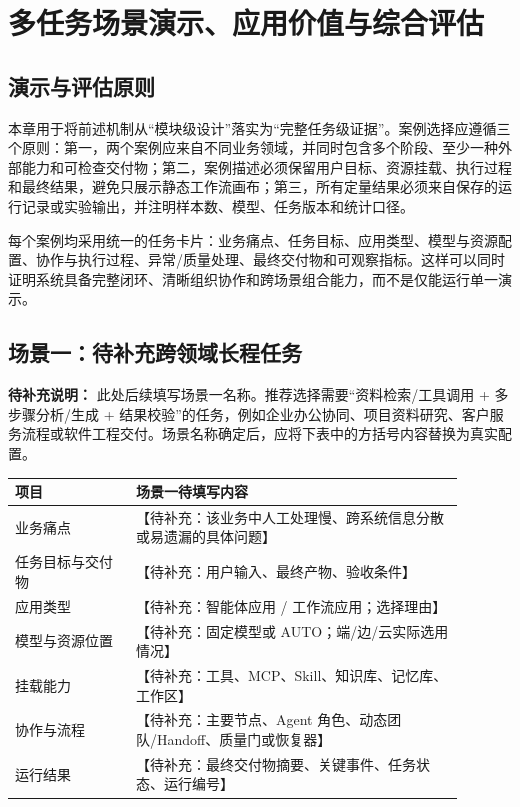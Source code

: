 \documentclass[UTF8,a4paper,12pt]{ctexart}
\begin{document}
\section{多任务场景演示、应用价值与综合评估}

\subsection{演示与评估原则}

本章用于将前述机制从“模块级设计”落实为“完整任务级证据”。案例选择应遵循三个原则：第一，两个案例应来自不同业务领域，并同时包含多个阶段、至少一种外部能力和可检查交付物；第二，案例描述必须保留用户目标、资源挂载、执行过程和最终结果，避免只展示静态工作流画布；第三，所有定量结果必须来自保存的运行记录或实验输出，并注明样本数、模型、任务版本和统计口径。

每个案例均采用统一的任务卡片：业务痛点、任务目标、应用类型、模型与资源配置、协作与执行过程、异常/质量处理、最终交付物和可观察指标。这样可以同时证明系统具备完整闭环、清晰组织协作和跨场景组合能力，而不是仅能运行单一演示。

\subsection{场景一：\textbf{待补充}跨领域长程任务}

\textbf{待补充说明：} 此处后续填写场景一名称。推荐选择需要“资料检索/工具调用 + 多步骤分析/生成 + 结果校验”的任务，例如企业办公协同、项目资料研究、客户服务流程或软件工程交付。场景名称确定后，应将下表中的方括号内容替换为真实配置。

\begin{longtable}{p{0.24\linewidth}p{0.65\linewidth}}
\toprule
项目 & 场景一待填写内容 \\
\midrule
业务痛点 & 【待补充：该业务中人工处理慢、跨系统信息分散或易遗漏的具体问题】 \\
任务目标与交付物 & 【待补充：用户输入、最终产物、验收条件】 \\
应用类型 & 【待补充：智能体应用 / 工作流应用；选择理由】 \\
模型与资源位置 & 【待补充：固定模型或 AUTO；端/边/云实际选用情况】 \\
挂载能力 & 【待补充：工具、MCP、Skill、知识库、记忆库、工作区】 \\
协作与流程 & 【待补充：主要节点、Agent 角色、动态团队/Handoff、质量门或恢复器】 \\
运行结果 & 【待补充：最终交付物摘要、关键事件、任务状态、运行编号】 \\
\bottomrule
\end{longtable}
\end{document}
